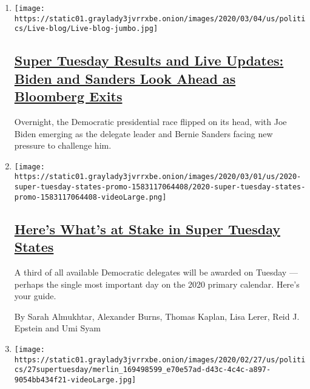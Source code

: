 \begin{enumerate}
\def\labelenumi{\arabic{enumi}.}
\item
  \texttt{[image: https://static01.graylady3jvrrxbe.onion/images/2020/03/04/us/politics/Live-blog/Live-blog-jumbo.jpg]}

  \hypertarget{super-tuesday-results-and-live-updates-biden-and-sanders-look-ahead-as-bloomberg-exits}{%
  \subsection{\texorpdfstring{\href{https://www.nytimes3xbfgragh.onion/live/2020/primary-results-biden-sanders-03-04}{Super
  Tuesday Results and Live Updates: Biden and Sanders Look Ahead as
  Bloomberg
  Exits}}{Super Tuesday Results and Live Updates: Biden and Sanders Look Ahead as Bloomberg Exits}}\label{super-tuesday-results-and-live-updates-biden-and-sanders-look-ahead-as-bloomberg-exits}}

  Overnight, the Democratic presidential race flipped on its head, with
  Joe Biden emerging as the delegate leader and Bernie Sanders facing
  new pressure to challenge him.
\item
  \texttt{[image: https://static01.graylady3jvrrxbe.onion/images/2020/03/01/us/2020-super-tuesday-states-promo-1583117064408/2020-super-tuesday-states-promo-1583117064408-videoLarge.png]}

  \hypertarget{heres-whats-at-stake-in-super-tuesday-states}{%
  \subsection{\texorpdfstring{\href{/interactive/2020/03/02/us/politics/2020-super-tuesday-states.html}{Here's
  What's at Stake in Super Tuesday
  States}}{Here's What's at Stake in Super Tuesday States}}\label{heres-whats-at-stake-in-super-tuesday-states}}

  A third of all available Democratic delegates will be awarded on
  Tuesday --- perhaps the single most important day on the 2020 primary
  calendar. Here's your guide.

  By Sarah Almukhtar, Alexander Burns, Thomas Kaplan, Lisa Lerer, Reid
  J. Epstein and Umi Syam
\item
  \texttt{[image: https://static01.graylady3jvrrxbe.onion/images/2020/02/27/us/politics/27supertuesday/merlin\_169498599\_e70e57ad-d43c-4c4c-a897-9054bb434f21-videoLarge.jpg]}

  \hypertarget{when-is-super-tuesday-and-what-is-it-exactly}{%
}
\end{enumerate}
